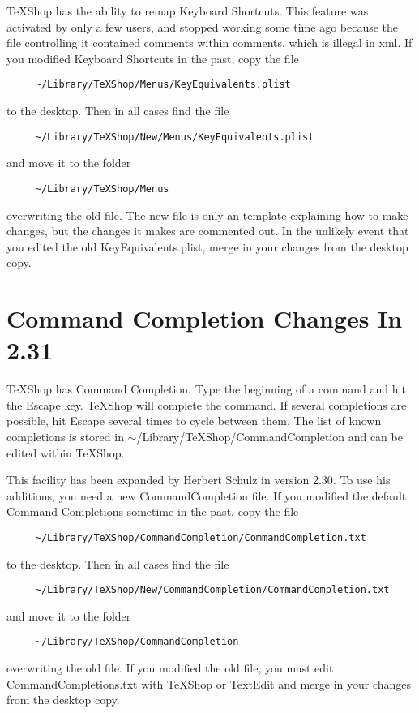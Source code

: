 \documentclass[11pt, oneside]{amsart}
\begin{document}
TeXShop has the ability to remap Keyboard Shortcuts. This feature was activated by only a few users, and stopped working some time ago because the file controlling it contained comments within comments, which is illegal in xml. If you modified Keyboard Shortcuts in the past, copy the file
\begin{verbatim}
     ~/Library/TeXShop/Menus/KeyEquivalents.plist
\end{verbatim}
 to  the desktop. Then in all cases find the file
\begin{verbatim}
     ~/Library/TeXShop/New/Menus/KeyEquivalents.plist
\end{verbatim}
and move it to the folder
\begin{verbatim}
     ~/Library/TeXShop/Menus
\end{verbatim}
overwriting the old file. The new file is only an template explaining how to make changes, but the changes it makes are commented out. In the unlikely event that you edited the old KeyEquivalents.plist, merge in your changes from the desktop copy.


\section{Command Completion Changes In 2.31}

TeXShop has Command Completion. Type the beginning of a command and hit the Escape key. TeXShop will complete the command. If several completions are possible, hit Escape several times to cycle between them.
The list of known completions is stored in $\sim$/Library/TeXShop/CommandCompletion and  can be edited within TeXShop.

This facility has been expanded by Herbert Schulz in version 2.30. To use his additions, you need a new CommandCompletion file. 
If you modified the default Command Completions sometime in the past, copy the file 
\begin{verbatim}
     ~/Library/TeXShop/CommandCompletion/CommandCompletion.txt 
\end{verbatim}
 to  the desktop. Then in all cases find the file
 \begin{verbatim}
     ~/Library/TeXShop/New/CommandCompletion/CommandCompletion.txt 
\end{verbatim}
and move it to the folder  
\begin{verbatim}
     ~/Library/TeXShop/CommandCompletion 
\end{verbatim}
overwriting the old file.  If you modified the old file, you must edit CommandCompletions.txt with TeXShop or TextEdit and merge in your changes from the desktop copy.
\end{document}
